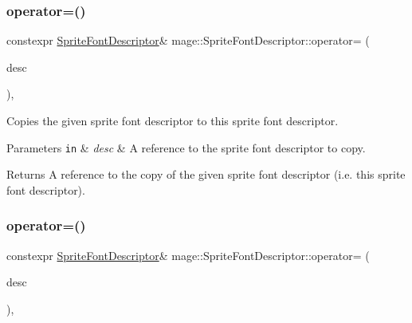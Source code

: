 \subsubsection{\texorpdfstring{operator=()}{operator=()}\hspace{0.1cm}{\footnotesize\ttfamily [1/2]}}
{\footnotesize\ttfamily constexpr \hyperlink{classmage_1_1_sprite_font_descriptor}{Sprite\+Font\+Descriptor}\& mage\+::\+Sprite\+Font\+Descriptor\+::operator= (\begin{DoxyParamCaption}\item[{const \hyperlink{classmage_1_1_sprite_font_descriptor}{Sprite\+Font\+Descriptor} \&}]{desc }\end{DoxyParamCaption})\hspace{0.3cm}{\ttfamily [default]}, {\ttfamily [noexcept]}}

Copies the given sprite font descriptor to this sprite font descriptor.


\begin{DoxyParams}[1]{Parameters}
\mbox{\tt in}  & {\em desc} & A reference to the sprite font descriptor to copy. \\
\hline
\end{DoxyParams}
\begin{DoxyReturn}{Returns}
A reference to the copy of the given sprite font descriptor (i.\+e. this sprite font descriptor). 
\end{DoxyReturn}
\hypertarget{classmage_1_1_sprite_font_descriptor_a2db76dba5839327af54faeda0cd91d27}{}\label{classmage_1_1_sprite_font_descriptor_a2db76dba5839327af54faeda0cd91d27} 
\subsubsection{\texorpdfstring{operator=()}{operator=()}\hspace{0.1cm}{\footnotesize\ttfamily [2/2]}}
{\footnotesize\ttfamily constexpr \hyperlink{classmage_1_1_sprite_font_descriptor}{Sprite\+Font\+Descriptor}\& mage\+::\+Sprite\+Font\+Descriptor\+::operator= (\begin{DoxyParamCaption}\item[{\hyperlink{classmage_1_1_sprite_font_descriptor}{Sprite\+Font\+Descriptor} \&\&}]{desc }\end{DoxyParamCaption})\hspace{0.3cm}{\ttfamily [default]}, {\ttfamily [noexcept]}}


